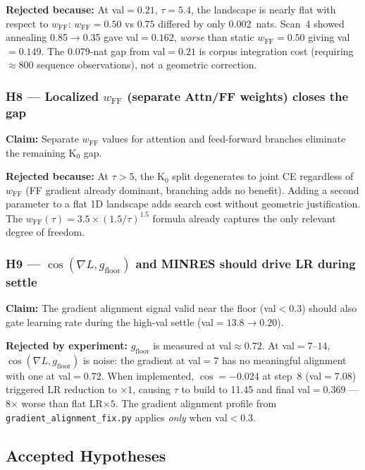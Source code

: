 \documentclass[11pt]{amsart}
\begin{document}
\textbf{Rejected because:} At val$=0.21$, $\tau=5.4$, the landscape is
nearly flat with respect to $w_\mathrm{FF}$:
$w_\mathrm{FF}=0.50$ vs $0.75$ differed by only 0.002~nats.
Scan~4 showed annealing 0.85$\to$0.35 gave val$=0.162$, \emph{worse}
than static $w_\mathrm{FF}=0.50$ giving val$=0.149$.
The 0.079-nat gap from val$=0.21$ is corpus integration cost
(requiring $\approx 800$ sequence observations),
not a geometric correction.

\subsubsection*{H8 — Localized $w_\mathrm{FF}$ (separate Attn/FF weights) closes the gap}

\textbf{Claim:} Separate $w_\mathrm{FF}$ values for attention and
feed-forward branches eliminate the remaining K$_0$ gap.

\textbf{Rejected because:} At $\tau > 5$, the K$_0$ split degenerates
to joint CE regardless of $w_\mathrm{FF}$ (FF gradient already dominant,
branching adds no benefit).
Adding a second parameter to a flat 1D landscape adds search cost
without geometric justification.
The $w_\mathrm{FF}(\tau) = 3.5 \times (1.5/\tau)^{1.5}$ formula already
captures the only relevant degree of freedom.

\subsubsection*{H9 — $\cos(\nabla L, g_\mathrm{floor})$ and MINRES should drive LR during settle}

\textbf{Claim:} The gradient alignment signal valid near the floor
(val$<0.3$) should also gate learning rate during the high-val settle
(val$=13.8 \to 0.20$).

\textbf{Rejected by experiment:} $g_\mathrm{floor}$ is measured at
val$\approx 0.72$.
At val$=7$--$14$, $\cos(\nabla L, g_\mathrm{floor})$ is noise:
the gradient at val$=7$ has no meaningful alignment with one at val$=0.72$.
When implemented, $\cos = -0.024$ at step~8 (val$=7.08$) triggered LR
reduction to $\times 1$, causing $\tau$ to build to 11.45 and final
val$=0.369$ — 8$\times$ worse than flat LR$\times 5$.
The gradient alignment profile from \texttt{gradient\_alignment\_fix.py}
applies \emph{only} when val$<0.3$.

\subsection{Accepted Hypotheses}
\end{document}
